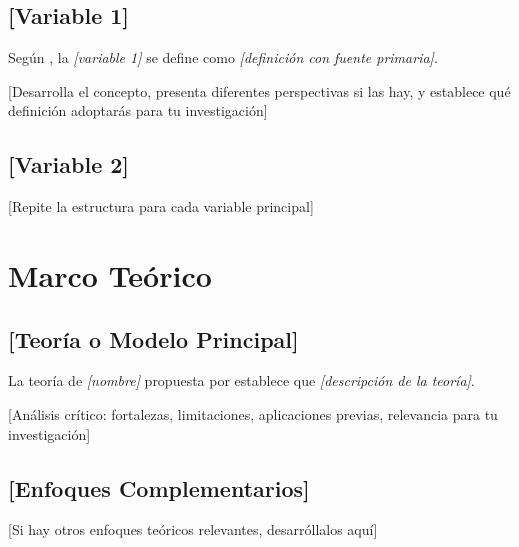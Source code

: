 \subsection{[Variable 1]}
\label{subsec:variable1}

Según \cite{autor2023}, la \textit{[variable 1]} se define como \textit{[definición con fuente primaria]}. 

[Desarrolla el concepto, presenta diferentes perspectivas si las hay, y establece qué definición adoptarás para tu investigación]

\subsection{[Variable 2]}
\label{subsec:variable2}

[Repite la estructura para cada variable principal]

\section{Marco Teórico}
\label{sec:marco_teorico_principal}


\subsection{[Teoría o Modelo Principal]}
\label{subsec:teoria_principal}

La teoría de \textit{[nombre]} propuesta por \cite{autor_original} establece que \textit{[descripción de la teoría]}.

[Análisis crítico: fortalezas, limitaciones, aplicaciones previas, relevancia para tu investigación]

\subsection{[Enfoques Complementarios]}
\label{subsec:enfoques_complementarios}

[Si hay otros enfoques teóricos relevantes, desarróllalos aquí]

